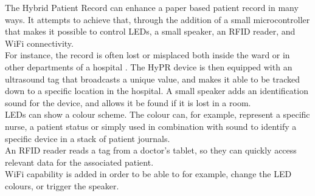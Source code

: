The Hybrid Patient Record can enhance a paper based patient record in many ways. It attempts to achieve that, through the addition of a small microcontroller that makes it possible to control LEDs, a small speaker, an RFID reader, and WiFi connectivity. \\
For instance, the record is often lost or misplaced both inside the ward or in other departments of a hospital \cite{hypr}. The HyPR device is then equipped with an ultrasound tag that broadcasts a unique value, and makes it able to be tracked down to a specific location in the hospital. A small speaker adds an identification sound for the device, and allows it be found if it is lost in a room. \\
LEDs can show a colour scheme. The colour can, for example, represent a specific nurse, a patient status or simply used in combination with sound to identify a specific device in a stack of patient journals. \\
An RFID reader reads a tag from a doctor's tablet, so they can quickly access relevant data for the associated patient. \\
WiFi capability is added in order to be able to for example, change the LED colours, or trigger the speaker.